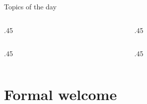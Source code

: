 \begin{frame}
    \titlepage
\end{frame}
\makeatletter
\setcounter{section}{-1\relax}%
\relax\space
\makeatother
\begin{frame}[label=toc,plain,noframenumbering]{Topics of the day}
    \vspace{-6mm}
    \begin{columns}[t]
        \begin{column}{.45\textwidth}
            \hspace*{4mm}
            \begin{minipage}[t][0.2\textheight]{\textwidth}
                \begin{NoHyper}
                    \tableofcontents[currentsection,sections={0}]
                \end{NoHyper}
            \end{minipage}
        \end{column}
        \begin{column}{.45\textwidth}
            \begin{minipage}[t][0.2\textheight]{\textwidth}
            \end{minipage}
        \end{column}
    \end{columns}
    \vspace{3.5mm}
    \begin{columns}[t]
        \begin{column}{.45\textwidth}
            \hspace*{4mm}
            \begin{minipage}[t][0.5\textheight]{\textwidth}
                \tableofcontents[sections={1-3},hideallsubsections]
            \end{minipage}
        \end{column}
        \begin{column}{.45\textwidth}
            \begin{minipage}[t][0.5\textheight]{\textwidth}
                \tableofcontents[sections={4-},hideallsubsections]
            \end{minipage}
        \end{column}
    \end{columns}
\end{frame}
\section{Formal welcome} %